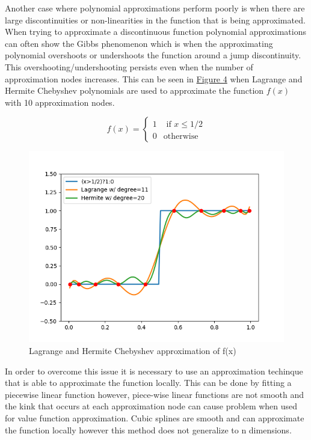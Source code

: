 \documentclass[12pt]{article}
\begin{document}
Another case where polynomial approximations perform poorly is when there are large discontinuities or non-linearities in the function that is being approximated. When trying to approximate a discontinuous function polynomial approximations can often show the Gibbs phenomenon which is when the approximating polynomial overshoots or undershoots the function around a jump discontinuity. This overshooting/undershooting persists even when the number of approximation nodes increases. This can be seen in \hyperref[ref_Cheb_Ind_Func]{Figure 4} when Lagrange and Hermite Chebyshev polynomials are used to approximate the function $f(x)$ with 10 approximation nodes.

\begin{equation}
  \label{ind_func}
  f(x)=\begin{cases}
    1 & \text{ if } x\leq1/2\\
    0 & \text{otherwise}
  \end{cases}
\end{equation}

\begin{figure}[H]
  \label{ref_Cheb_Ind_Func}
  \centering
  \includegraphics[scale=.8]{plot_Cheb_Ind_Func}
  \caption{Lagrange and Hermite Chebyshev approximation of f(x)}
\end{figure}

In order to overcome this issue it is necessary to use an approximation techinque that is able to approximate the function locally. This can be done by fitting a piecewise linear function however, piece-wise linear functions are not smooth and the kink that occurs at each approximation node can cause problem when used for value function approximation. Cubic splines are smooth and can approximate the function locally however this method does not generalize to n dimensions.
\end{document}
